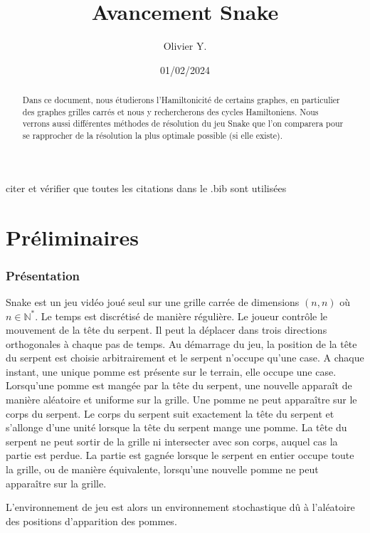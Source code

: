 \documentclass[french,a4paper]{article}
\title{Avancement Snake}
\author{Olivier Y.}
\date{01/02/2024}
\begin{document}

\maketitle
\begin{abstract}
Dans ce document, nous étudierons l'Hamiltonicité de certains graphes, en particulier des graphes grilles carrés et nous y rechercherons des cycles Hamiltoniens. Nous verrons aussi différentes méthodes de résolution du jeu Snake que l'on comparera pour se rapprocher de la résolution la plus optimale possible (si elle existe).
\end{abstract}


\tableofcontents





citer et vérifier que toutes les citations dans le .bib sont utilisées

\newpage
\part{Préliminaires}



\section{Présentation}
Snake est un jeu vidéo joué seul sur une grille carrée de dimensions $(n,n)$ où $n \in \mathbb{N}^*$. Le temps est discrétisé de manière régulière. Le joueur contrôle le mouvement de la tête du serpent. Il peut la déplacer dans trois directions orthogonales à chaque pas de temps. Au démarrage du jeu, la position de la tête du serpent est choisie arbitrairement et le serpent n'occupe qu'une case. A chaque instant, une unique pomme est présente sur le terrain, elle occupe une case. Lorsqu'une pomme est mangée par la tête du serpent, une nouvelle apparaît de manière aléatoire et uniforme sur la grille. Une pomme ne peut apparaître sur le corps du serpent. Le corps du serpent suit exactement la tête du serpent et s'allonge d'une unité lorsque la tête du serpent mange une pomme. La tête du serpent ne peut sortir de la grille ni intersecter avec son corps, auquel cas la partie est perdue. La partie est gagnée lorsque le serpent en entier occupe toute la grille, ou de manière équivalente, lorsqu'une nouvelle pomme ne peut apparaître sur la grille.

L'environnement de jeu est alors un environnement stochastique dû à l'aléatoire des positions d'apparition des pommes.
\end{document}
